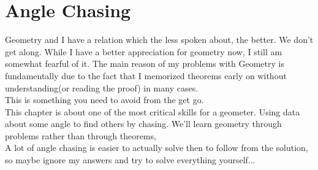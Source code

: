 \chapter{Angle Chasing}
Geometry and I have a relation which the less spoken about, the better. We don't get along. While I have a better appreciation for geometry now, I still am somewhat fearful of it. The main reason of my problems with Geometry is fundamentally due to the fact that I memorized theorems early on without understanding(or reading the proof) in many cases.\\
This is something you need to avoid from the get go. \\
This chapter is about one of the most critical skills for a geometer. Using data about some angle to find others by chasing. We'll learn geometry through problems rather than through theorems,\\
A lot of angle chasing is easier to actually solve then to follow from the solution, so maybe ignore my answers and try to solve everything yourself...\\

